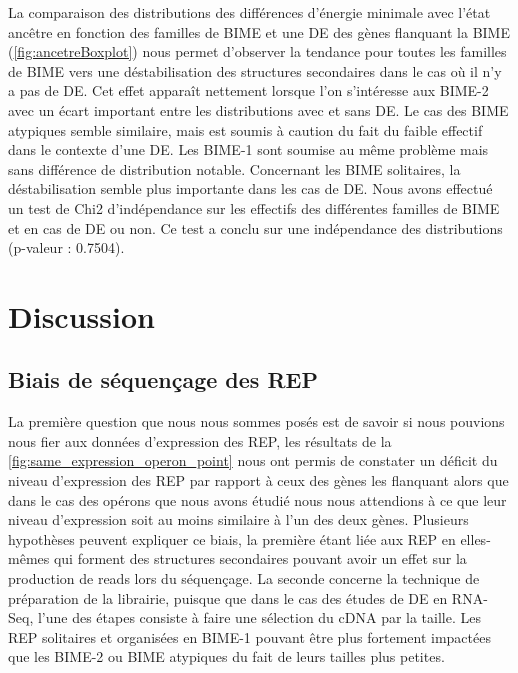 \documentclass[12pt,a4paper]{report}
\begin{document}
\begin{onehalfspace}
La comparaison des distributions des différences d'énergie minimale avec l'état ancêtre en fonction des familles de BIME et une DE des gènes flanquant la BIME (\autoref{fig:ancetreBoxplot}) nous permet d'observer la tendance pour toutes les familles de BIME vers une déstabilisation des structures secondaires dans le cas où il n'y a pas de DE. Cet effet apparaît nettement lorsque l'on s'intéresse aux BIME-2 avec un écart important entre les distributions avec et sans DE. Le cas des BIME atypiques semble similaire, mais est soumis à caution du fait du faible effectif dans le contexte d'une DE. Les BIME-1 sont soumise au même problème mais sans différence de distribution notable. Concernant les BIME solitaires, la déstabilisation semble plus importante dans les cas de DE.
Nous avons effectué un test de Chi2 d'indépendance sur les effectifs des différentes familles de BIME et en cas de DE ou non. Ce test a conclu sur une indépendance des distributions (p-valeur : 0.7504).


\chapter*{Discussion}

\section*{Biais de séquençage des REP}
La première question que nous nous sommes posés est de savoir si nous pouvions nous fier aux données d'expression des REP, les résultats de la \autoref{fig:same_expression_operon_point} nous ont permis de constater un déficit du niveau d'expression des REP par rapport à ceux des gènes les flanquant alors que dans le cas des opérons que nous avons étudié nous nous attendions à ce que leur niveau d'expression soit au moins similaire à l'un des deux gènes. Plusieurs hypothèses peuvent expliquer ce biais, la première étant liée aux REP en elles-mêmes qui forment des structures secondaires pouvant avoir un effet sur la production de reads lors du séquençage. La seconde concerne la technique de préparation de la librairie, puisque que dans le cas des études de DE en RNA-Seq, l'une des étapes consiste à faire une sélection du cDNA par la taille. Les REP solitaires et organisées en BIME-1 pouvant être plus fortement impactées que les BIME-2 ou BIME atypiques du fait de leurs tailles plus petites.


\end{onehalfspace}
\end{document}
